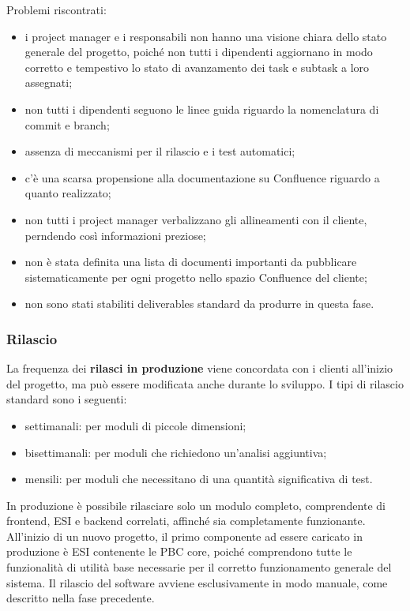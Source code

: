         Problemi riscontrati:
        \begin{itemize}
            \item i project manager e i responsabili non hanno una visione chiara dello stato generale del progetto, poiché non tutti i dipendenti aggiornano in modo corretto e tempestivo
            lo stato di avanzamento dei task e subtask a loro assegnati;
            \item non tutti i dipendenti seguono le linee guida riguardo la nomenclatura di commit e branch;
            \item assenza di meccanismi per il rilascio e i test automatici;
            \item c'è una scarsa propensione alla documentazione su Confluence riguardo a quanto realizzato;            
            \item non tutti i project manager verbalizzano gli allineamenti con il cliente, perndendo così informazioni preziose;
            \item non è stata definita una lista di documenti importanti da pubblicare sistematicamente per ogni progetto nello spazio Confluence del cliente;
            \item non sono stati stabiliti deliverables standard da produrre in questa fase.
        \end{itemize}

        \subsubsection{Rilascio}
        La frequenza dei \textbf{rilasci in produzione} viene concordata con i clienti all'inizio del progetto, ma può essere modificata anche durante lo sviluppo.
        I tipi di rilascio standard sono i seguenti:
        \begin{itemize}
            \item settimanali: per moduli di piccole dimensioni;
            \item bisettimanali: per moduli che richiedono un'analisi aggiuntiva;
            \item mensili: per moduli che necessitano di una quantità significativa di test.
        \end{itemize}  
        
        In produzione è possibile rilasciare solo un modulo completo, comprendente di frontend, \ac{ESI} e backend correlati, affinché sia completamente funzionante.
        All'inizio di un nuovo progetto, il primo componente ad essere caricato in produzione è \ac{ESI} contenente le \ac{PBC} core, poiché comprendono
        tutte le funzionalità di utilità base necessarie per il corretto funzionamento generale del sistema.
        Il rilascio del software avviene esclusivamente in modo manuale, come descritto nella fase precedente.
        
